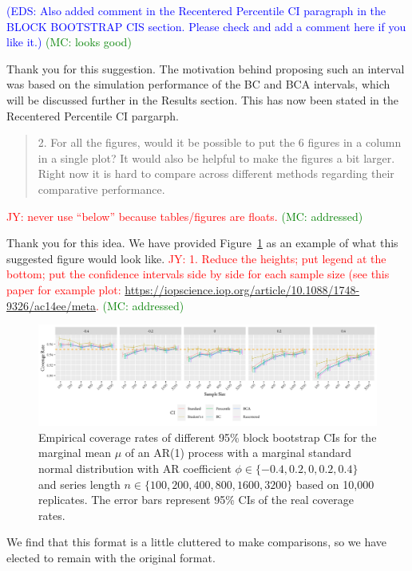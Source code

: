 \documentclass[12pt]{article}
\newcommand{\jy}[1]{\textcolor{red}{JY: #1}}
\newcommand{\eds}[1]{\textcolor{blue}{(EDS: #1)}}
\newcommand{\mc}[1]{\textcolor{green}{(MC: #1)}}
\newenvironment{comment}%
{\begin{quotation}\noindent\small\it\color{darkblue}\ignorespaces%
}{\end{quotation}}
\begin{document}
\eds{Also added comment in the Recentered Percentile CI paragraph in the 
BLOCK BOOTSTRAP CIS section. Please check and add a comment here if you like it.}
\mc{looks good}

Thank you for this suggestion. The motivation behind proposing such an interval 
was based on the 
simulation performance of the BC and BCA intervals, which will be discussed
further in the Results section. This has now been stated in the Recentered
Percentile CI pargarph.



\begin{comment}
2. For all the figures, would it be possible to put the 6 figures in a column in 
a single plot? It would also be helpful to make the figures a bit larger. Right 
now it is hard to compare across different methods regarding their comparative 
performance.
\end{comment}

\jy{never use ``below'' because tables/figures are floats.}
\mc{addressed}

Thank you for this idea. We have provided Figure~\ref{fig:mu} as an 
example of what this suggested figure
would look like. 
\jy{1. Reduce the heights; put legend at the bottom; put the
  confidence intervals side by side for each sample size (see this
  paper for example plot:
  \url{https://iopscience.iop.org/article/10.1088/1748-9326/ac14ee/meta}.}
\mc{addressed}

\begin{figure}[tbp]
  \centering
  \includegraphics[width=\textwidth]{figures/alt_plot_norm_mu_1}
  \caption{Empirical coverage rates of different 95\% block bootstrap CIs for
    the marginal mean $\mu$ of an AR(1) process with a marginal standard 
    normal distribution with AR coefficient
    $\phi \in \{-0.4, 0.2, 0, 0.2, 0.4\}$ and series length
    $n \in \{100, 200, 400, 800, 1600, 3200\}$ based on 10,000 replicates. The
    error bars represent 95\% CIs of the real coverage rates.}
  \label{fig:mu}
\end{figure}

We find that this format
is a little
cluttered to make comparisons, so we have elected to remain with the original 
format.
\end{document}
